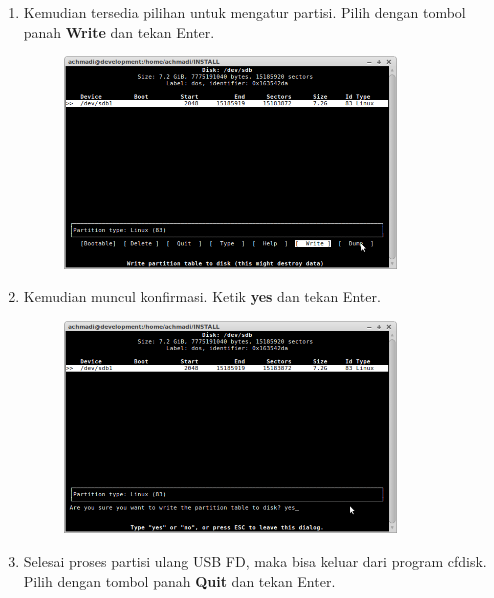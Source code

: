 \documentclass[12pt,]{article}
\begin{document}
\begin{enumerate}
		\item Kemudian tersedia pilihan untuk mengatur partisi.
		Pilih dengan tombol panah \textbf{Write} dan tekan Enter.
		
		\newpage
		\begin{figure}[h]
			\centering
			\includegraphics[width=250pt]{usbubuntu/step_8}
		\end{figure}
	
		\item Kemudian muncul konfirmasi. Ketik \textbf{yes} dan tekan Enter.
		
		\begin{figure}[h]
			\centering
			\includegraphics[width=250pt]{usbubuntu/step_9}
		\end{figure}
	
		\item Selesai proses partisi ulang USB FD, maka bisa keluar dari program cfdisk. 
		Pilih dengan tombol panah \textbf{Quit} dan tekan Enter.
		

\end{enumerate}
\end{document}
